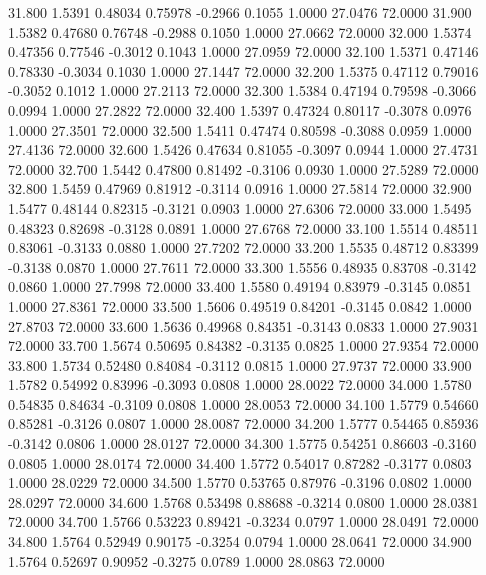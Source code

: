   31.800   1.5391   0.48034   0.75978  -0.2966   0.1055   1.0000  27.0476  72.0000
  31.900   1.5382   0.47680   0.76748  -0.2988   0.1050   1.0000  27.0662  72.0000
  32.000   1.5374   0.47356   0.77546  -0.3012   0.1043   1.0000  27.0959  72.0000
  32.100   1.5371   0.47146   0.78330  -0.3034   0.1030   1.0000  27.1447  72.0000
  32.200   1.5375   0.47112   0.79016  -0.3052   0.1012   1.0000  27.2113  72.0000
  32.300   1.5384   0.47194   0.79598  -0.3066   0.0994   1.0000  27.2822  72.0000
  32.400   1.5397   0.47324   0.80117  -0.3078   0.0976   1.0000  27.3501  72.0000
  32.500   1.5411   0.47474   0.80598  -0.3088   0.0959   1.0000  27.4136  72.0000
  32.600   1.5426   0.47634   0.81055  -0.3097   0.0944   1.0000  27.4731  72.0000
  32.700   1.5442   0.47800   0.81492  -0.3106   0.0930   1.0000  27.5289  72.0000
  32.800   1.5459   0.47969   0.81912  -0.3114   0.0916   1.0000  27.5814  72.0000
  32.900   1.5477   0.48144   0.82315  -0.3121   0.0903   1.0000  27.6306  72.0000
  33.000   1.5495   0.48323   0.82698  -0.3128   0.0891   1.0000  27.6768  72.0000
  33.100   1.5514   0.48511   0.83061  -0.3133   0.0880   1.0000  27.7202  72.0000
  33.200   1.5535   0.48712   0.83399  -0.3138   0.0870   1.0000  27.7611  72.0000
  33.300   1.5556   0.48935   0.83708  -0.3142   0.0860   1.0000  27.7998  72.0000
  33.400   1.5580   0.49194   0.83979  -0.3145   0.0851   1.0000  27.8361  72.0000
  33.500   1.5606   0.49519   0.84201  -0.3145   0.0842   1.0000  27.8703  72.0000
  33.600   1.5636   0.49968   0.84351  -0.3143   0.0833   1.0000  27.9031  72.0000
  33.700   1.5674   0.50695   0.84382  -0.3135   0.0825   1.0000  27.9354  72.0000
  33.800   1.5734   0.52480   0.84084  -0.3112   0.0815   1.0000  27.9737  72.0000
  33.900   1.5782   0.54992   0.83996  -0.3093   0.0808   1.0000  28.0022  72.0000
  34.000   1.5780   0.54835   0.84634  -0.3109   0.0808   1.0000  28.0053  72.0000
  34.100   1.5779   0.54660   0.85281  -0.3126   0.0807   1.0000  28.0087  72.0000
  34.200   1.5777   0.54465   0.85936  -0.3142   0.0806   1.0000  28.0127  72.0000
  34.300   1.5775   0.54251   0.86603  -0.3160   0.0805   1.0000  28.0174  72.0000
  34.400   1.5772   0.54017   0.87282  -0.3177   0.0803   1.0000  28.0229  72.0000
  34.500   1.5770   0.53765   0.87976  -0.3196   0.0802   1.0000  28.0297  72.0000
  34.600   1.5768   0.53498   0.88688  -0.3214   0.0800   1.0000  28.0381  72.0000
  34.700   1.5766   0.53223   0.89421  -0.3234   0.0797   1.0000  28.0491  72.0000
  34.800   1.5764   0.52949   0.90175  -0.3254   0.0794   1.0000  28.0641  72.0000
  34.900   1.5764   0.52697   0.90952  -0.3275   0.0789   1.0000  28.0863  72.0000

